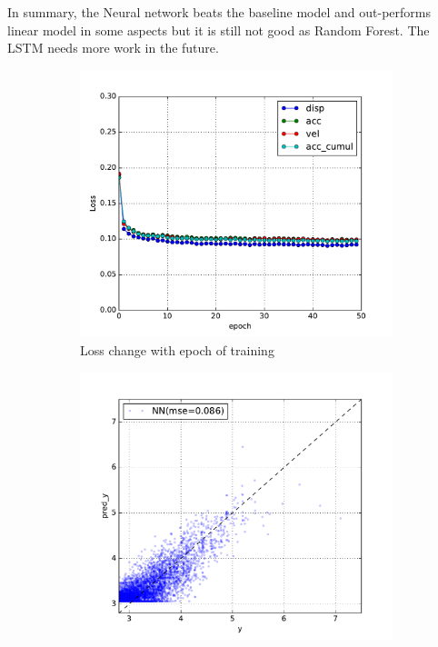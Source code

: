 \documentclass{article} %
\begin{document}
In summary, the Neural network beats the baseline model and out-performs linear model in some aspects but it is still not good as Random Forest.  The LSTM needs more work in the future.

\begin{figure}[ht!]
\centering
\begin{subfigure}{0.48\textwidth}
\centering
\includegraphics[width = \textwidth]{./figure/nn_loss}
\caption{Loss change with epoch of training}
\label{fig:nn_left}
\end{subfigure}
\begin{subfigure}{0.48\textwidth}
\centering
\includegraphics[width = \textwidth]{./figure/nn_prediction}

\end{subfigure}
\end{figure}
\end{document}
